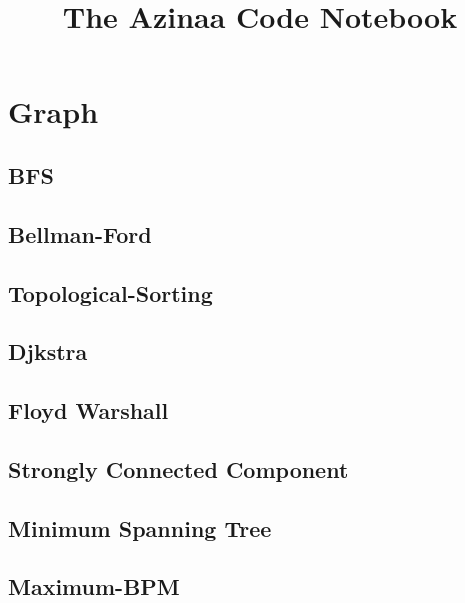 \documentclass[4pt,twocolumn, landscape, a4paper]{report}
\begin{document}
\begin{titlepage}
\title{The Azinaa Code Notebook}
\maketitle
\end{titlepage}
\newpage
  \tableofcontents
\newpage
\section{Graph}

\subsection{BFS}


\subsection{Bellman-Ford}


\subsection{Topological-Sorting}


\subsection{Djkstra}


\subsection{Floyd Warshall}


\subsection{Strongly Connected Component}


\subsection{Minimum Spanning Tree}


\subsection{Maximum-BPM}

\end{document}
